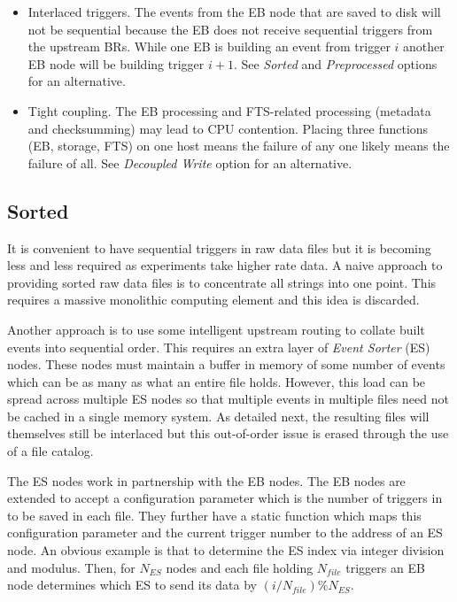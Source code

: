 \documentclass[pdftex,12pt,letter]{article}
\begin{document}
\begin{itemize}
\item Interlaced triggers.  The events from the EB node that are saved
  to disk will not be sequential because the EB does not receive
  sequential triggers from the upstream BRs.  While one EB is building
  an event from trigger $i$ another EB node will be building trigger
  $i+1$.  See \textit{Sorted} and \textit{Preprocessed} options for an
  alternative.
\item Tight coupling.  The EB processing and FTS-related processing
  (metadata and checksumming) may lead to CPU contention.  Placing
  three functions (EB, storage, FTS) on one host means the failure of
  any one likely means the failure of all.  See \textit{Decoupled Write}
  option for an alternative.
\end{itemize}

\subsection{Sorted}

It is convenient to have sequential triggers in raw data files but it
is becoming less and less required as experiments take higher rate
data.  A naive approach to providing sorted raw data files is to
concentrate all strings into one point.  This requires a massive
monolithic computing element and this idea is discarded.

Another approach is to use some intelligent upstream routing to
collate built events into sequential order.  This requires an extra
layer of \textit{Event Sorter} (ES) nodes.  These nodes must maintain
a buffer in memory of some number of events which can be as many as
what an entire file holds.  However, this load can be spread across
multiple ES nodes so that multiple events in multiple files need not
be cached in a single memory system.  As detailed next, the resulting
files will themselves still be interlaced but this out-of-order issue
is erased through the use of a file catalog.

The ES nodes work in partnership with the EB nodes.  The EB nodes are
extended to accept a configuration parameter which is the number of
triggers in to be saved in each file.  They further have a static
function which maps this configuration parameter and the current
trigger number to the address of an ES node.  An obvious example is
that to determine the ES index via integer division and modulus.
Then, for $N_{ES}$ nodes and each file holding $N_{file}$ triggers
an EB node determines which ES to send its data by $(i/N_{file})\%N_{ES}$.
\end{document}

